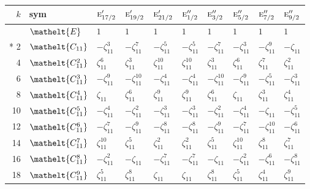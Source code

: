 \documentclass[10pt,a4paper]{article}
\numberwithin{equation}{section}
\newcommand{\eltfont}[1]{{\let\sigma\eltsigma\mathelt{#1}}}
\newcommand{\irr}[1]{\text{\normalfont\scshape #1}}
\newcommand{\cls}[1]{\eltfont{#1}}
\newcommand{\rootunity}[1]{\zeta_{#1}}
\begin{document}
{\small\setlength{\tabcolsep}{4pt}
\begin{longtable}{@{}rlllllllll@{}}\toprule
$k$ & sym & $\irr{e}_{17/2}'$ & $\irr{e}_{19/2}'$ & $\irr{e}_{21/2}'$ & $\irr{e}_{1/2}''$ & $\irr{e}_{3/2}''$ & $\irr{e}_{5/2}''$ & $\irr{e}_{7/2}''$ & $\irr{e}_{9/2}''$\\\midrule\endhead
\bottomrule\endfoot\endlastfoot
0 & $\cls{E}$ & $1$ & $1$ & $1$ & $1$ & $1$ & $1$ & $1$ & $1$\\*
2 & $\cls{C_{11}}$ & $-\rootunity{11}^{3}$ & $-\rootunity{11}^{7}$ & $-\rootunity{11}^{5}$ & $-\rootunity{11}^{5}$ & $-\rootunity{11}^{7}$ & $-\rootunity{11}^{3}$ & $-\rootunity{11}^{9}$ & $-\rootunity{11}$\\
4 & $\cls{C_{11}^{2}}$ & $\rootunity{11}^{6}$ & $\rootunity{11}^{3}$ & $\rootunity{11}^{10}$ & $\rootunity{11}^{10}$ & $\rootunity{11}^{3}$ & $\rootunity{11}^{6}$ & $\rootunity{11}^{7}$ & $\rootunity{11}^{2}$\\
6 & $\cls{C_{11}^{3}}$ & $-\rootunity{11}^{9}$ & $-\rootunity{11}^{10}$ & $-\rootunity{11}^{4}$ & $-\rootunity{11}^{4}$ & $-\rootunity{11}^{10}$ & $-\rootunity{11}^{9}$ & $-\rootunity{11}^{5}$ & $-\rootunity{11}^{3}$\\
8 & $\cls{C_{11}^{4}}$ & $\rootunity{11}$ & $\rootunity{11}^{6}$ & $\rootunity{11}^{9}$ & $\rootunity{11}^{9}$ & $\rootunity{11}^{6}$ & $\rootunity{11}$ & $\rootunity{11}^{3}$ & $\rootunity{11}^{4}$\\
10 & $\cls{C_{11}^{5}}$ & $-\rootunity{11}^{4}$ & $-\rootunity{11}^{2}$ & $-\rootunity{11}^{3}$ & $-\rootunity{11}^{3}$ & $-\rootunity{11}^{2}$ & $-\rootunity{11}^{4}$ & $-\rootunity{11}$ & $-\rootunity{11}^{5}$\\
12 & $\cls{C_{11}^{6}}$ & $-\rootunity{11}^{7}$ & $-\rootunity{11}^{9}$ & $-\rootunity{11}^{8}$ & $-\rootunity{11}^{8}$ & $-\rootunity{11}^{9}$ & $-\rootunity{11}^{7}$ & $-\rootunity{11}^{10}$ & $-\rootunity{11}^{6}$\\
14 & $\cls{C_{11}^{7}}$ & $\rootunity{11}^{10}$ & $\rootunity{11}^{5}$ & $\rootunity{11}^{2}$ & $\rootunity{11}^{2}$ & $\rootunity{11}^{5}$ & $\rootunity{11}^{10}$ & $\rootunity{11}^{8}$ & $\rootunity{11}^{7}$\\
16 & $\cls{C_{11}^{8}}$ & $-\rootunity{11}^{2}$ & $-\rootunity{11}$ & $-\rootunity{11}^{7}$ & $-\rootunity{11}^{7}$ & $-\rootunity{11}$ & $-\rootunity{11}^{2}$ & $-\rootunity{11}^{6}$ & $-\rootunity{11}^{8}$\\
18 & $\cls{C_{11}^{9}}$ & $\rootunity{11}^{5}$ & $\rootunity{11}^{8}$ & $\rootunity{11}$ & $\rootunity{11}$ & $\rootunity{11}^{8}$ & $\rootunity{11}^{5}$ & $\rootunity{11}^{4}$ & $\rootunity{11}^{9}$\\

\end{longtable}}
\end{document}
